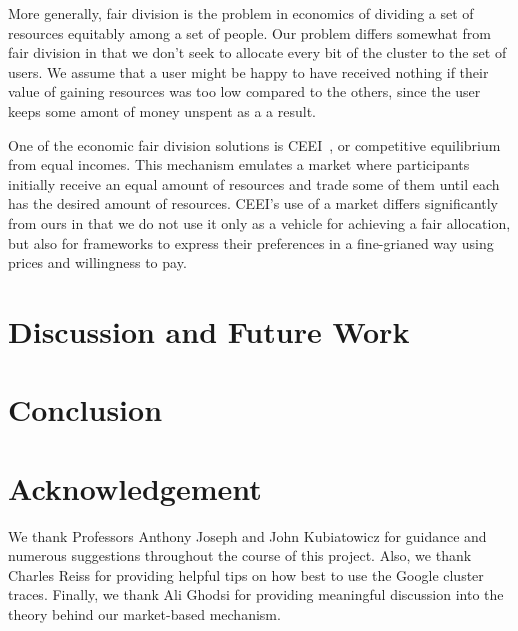 \documentclass{acm_proc_article-sp}
\begin{document}
More generally, fair division is the problem in economics of dividing a set of
resources equitably among a set of people. Our problem differs somewhat from
fair division in that we don't seek to allocate every bit of the cluster to the
set of users. We assume that a user might be happy to have received nothing if
their value of gaining resources was too low compared to the others, since the
user keeps some amont of money unspent as a a result.

One of the economic fair division solutions is CEEI~\cite{moulin2004fair}, or
competitive equilibrium from equal incomes. This mechanism emulates a market
where participants initially receive an equal amount of resources and trade some
of them until each has the desired amount of resources. CEEI's use of a market
differs significantly from ours in that we do not use it only as a vehicle for
achieving a fair allocation, but also for frameworks to express their
preferences in a fine-grianed way using prices and willingness to pay.

\section{Discussion and Future Work}
\label{sec:future}


\section{Conclusion}
\label{sec:conclusion}

\section{Acknowledgement}

We thank Professors Anthony Joseph and John Kubiatowicz for guidance and numerous suggestions throughout the course of this project. Also, we thank Charles Reiss for providing helpful tips on how best to use the Google cluster traces. Finally, we thank Ali Ghodsi for providing meaningful discussion into the theory behind our market-based mechanism.
\end{document}
